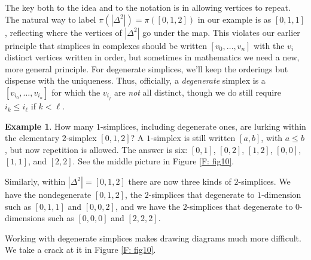 \documentclass[12pt]{article}
\theoremstyle{plain}
\theoremstyle{definition}
\newtheorem{example}[theorem]{Example}
\begin{document}
The key both to the idea and to the notation is in allowing vertices to repeat. The natural way to label $\pi(|\Delta^2|)=\pi([0,1,2])$ in our example is as $[0,1,1]$, reflecting where the vertices of $|\Delta^2|$ go under the map. This violates our earlier principle that simplices in complexes should be written $[v_0,\ldots,v_n]$ with the $v_i$  distinct  vertices written in order, but sometimes in mathematics we need a new, more general principle. For degenerate simplices, we'll keep the orderings but dispense with the uniqueness. Thus, officially, a \emph{degenerate} simplex is a $[v_{i_0},\ldots, v_{i_n}]$ for which  the $v_{i_j}$ are \emph{not} all distinct, though we do still require  $i_k\leq i_\ell$ if $k<\ell$.



\begin{example}
How many  $1$-simplices, including degenerate ones, are lurking within the elementary $2$-simplex $[0,1,2]$? A $1$-simplex is still written $[a,b]$, with $a\leq b$, but now repetition is allowed. The answer is six: $[0,1]$, $[0,2]$, $[1,2]$, $[0,0]$, $[1,1]$, and $[2,2]$. See the middle picture in Figure \ref{F: fig10}.

Similarly, within $|\Delta^2|=[0,1,2]$ there are now three kinds of $2$-simplices. We have the nondegenerate $[0,1,2]$, the $2$-simplices that degenerate to $1$-dimension such as $[0,1,1]$ and $[0,0,2]$, and we have the $2$-simplices that degenerate to $0$-dimensions such as $[0,0,0]$ and $[2,2,2]$. 
\end{example}

Working with degenerate simplices makes drawing diagrams much more difficult. We take  a crack at it in Figure \ref{F: fig10}. 
\end{document}
